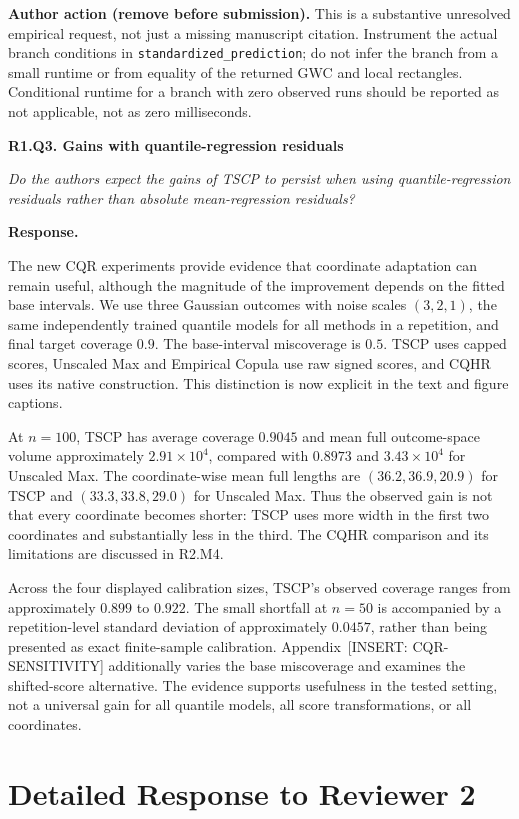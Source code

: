 \documentclass[11pt]{article}
\numberwithin{equation}{section}
\newcommand{\pending}[1]{\textcolor{AuthorRed}{[INSERT: #1]}}
\newcommand{\authoraction}[1]{%
  \par\begingroup\small\color{AuthorRed}%
  \textbf{Author action (remove before submission).} #1\par\endgroup}
\newcommand{\reviewercomment}[2]{%
  \par\medskip\noindent\textbf{#1}\par\nopagebreak
  \begingroup\color{ReviewerBlue}\itshape #2\par\endgroup
  \noindent\textbf{Response.} }
\newcommand{\AppCQR}{Appendix~\pending{CQR-SENSITIVITY}} %
\begin{document}
\authoraction{This is a substantive unresolved empirical request, not
just a missing manuscript citation. Instrument the actual branch
conditions in \texttt{standardized\_prediction}; do not infer the
branch from a small runtime or from equality of the returned GWC and
local rectangles. Conditional runtime for a branch with zero observed
runs should be reported as not applicable, not as zero milliseconds.}

\reviewercomment{R1.Q3. Gains with quantile-regression residuals}{%
Do the authors expect the gains of TSCP to persist when using
quantile-regression residuals rather than absolute mean-regression
residuals?}

The new CQR experiments provide evidence that coordinate adaptation can
remain useful, although the magnitude of the improvement depends on
the fitted base intervals. We use three Gaussian outcomes with noise
scales $(3,2,1)$, the same independently trained quantile models for
all methods in a repetition, and final target coverage $0.9$. The
base-interval miscoverage is $0.5$. TSCP uses capped scores, Unscaled
Max and Empirical Copula use raw signed scores, and CQHR uses its
native construction. This distinction is now explicit in the text
and figure captions.

At $n=100$, TSCP has average coverage $0.9045$ and mean full
outcome-space volume approximately $2.91\times10^4$, compared with
$0.8973$ and $3.43\times10^4$ for Unscaled Max. The coordinate-wise
mean full lengths are $(36.2,36.9,20.9)$ for TSCP and
$(33.3,33.8,29.0)$ for Unscaled Max. Thus the observed gain is not
that every coordinate becomes shorter: TSCP uses more width in the
first two coordinates and substantially less in the third. The CQHR
comparison and its limitations are discussed in R2.M4.

Across the four displayed calibration sizes, TSCP's observed coverage
ranges from approximately $0.899$ to $0.922$. The small shortfall
at $n=50$ is accompanied by a repetition-level standard deviation
of approximately $0.0457$, rather than being presented as exact
finite-sample calibration. \AppCQR{} additionally varies the base
miscoverage and examines the shifted-score alternative. The evidence
supports usefulness in the tested setting, not a universal gain for
all quantile models, all score transformations, or all coordinates.

\section{Detailed Response to Reviewer 2}
\label{sec:reviewer2}
\end{document}
